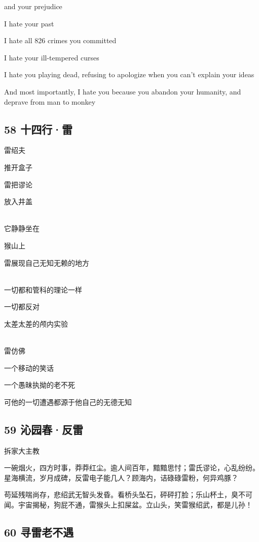 and your prejudice

I hate your past

I hate all 826 crimes you committed

I hate your ill-tempered curses

I hate you playing dead, refusing to apologize when you can't explain
your ideas

And most importantly, I hate you because you abandon your humanity, and
deprave from man to monkey

\hypertarget{ux5341ux56dbux884cux96f7}{%
\subsection{58 十四行·雷}\label{ux5341ux56dbux884cux96f7}}

雷绍夫

推开盒子

雷把谬论

放入井盖

~\\
它静静坐在

猴山上

雷展现自己无知无赖的地方

~\\
一切都和管科的理论一样

一切都反对

太差太差的颅内实验

~\\
雷仿佛

一个移动的笑话

一个愚昧执拗的老不死

可他的一切遭遇都源于他自己的无德无知

\hypertarget{ux6c81ux56edux6625ux53cdux96f7}{%
\subsection{59 沁园春·反雷}\label{ux6c81ux56edux6625ux53cdux96f7}}

拆家大主教

一碗烟火，四方时事，莽莽红尘。逾人间百年，黯黯思忖；雷氏谬论，心乱纷纷。星海横流，岁月成碑，反雷电子能几人？顾海内，诘碌碌雷粉，何异鸡豚？

苟延残喘尚存，悲绍武无智头发昏。看桥头坠石，砰砰打脸；乐山杯土，臭不可闻。宇宙揭秘，狗屁不通，雷猴头上扣屎盆。立山头，笑雷猴绍武，都是儿孙！

\hypertarget{ux5bfbux96f7ux8001ux4e0dux9047}{%
\subsection{60 寻雷老不遇}\label{ux5bfbux96f7ux8001ux4e0dux9047}}

